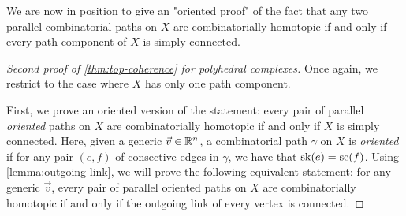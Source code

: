 We are now in position to give an "oriented proof" of the fact that any two parallel combinatorial paths on $X$ are combinatorially homotopic if and only if every path component of $X$ is simply connected.

\begin{proof}[Second proof of {\cref{thm:top-coherence}} for polyhedral complexes]
    \label{p:second-proof}
    Once again, we restrict to the case where $X$ has only one path component. 

    First, we prove an oriented version of the statement: every pair of parallel \emph{oriented} paths on $X$ are combinatorially homotopic if and only if $X$ is simply connected.
    Here, given a generic $\vec v \in \mathbb R^n$, a combinatorial path $\gamma$ on $X$ is \emph{oriented} if for any pair $(e, f)$ of consective edges in $\gamma$, we have that $\mathrm{sk}(e)=\mathrm{sc}(f)$.  
    Using \cref{lemma:outgoing-link}, we will prove the following equivalent statement: for any generic $\vec v$, every pair of parallel oriented paths on $X$ are combinatorially homotopic if and only if the outgoing link of every vertex is connected.


\end{proof}
